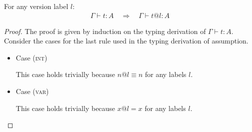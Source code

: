 \begin{lemma}
\label{lemma:overwriting}

For any version label $l$:
\begin{align*}
    \Gamma \vdash t : A
    \hspace{1em}\Longrightarrow\hspace{1em}
    \Gamma \vdash t@l : A
\end{align*}
\end{lemma}
\begin{proof}
The proof is given by induction on the typing derivation of $\Gamma \vdash t : A$.
Consider the cases for the last rule used in the typing derivation of assumption.
\\

\begin{itemize}
\item Case (\textsc{int})
\begin{center}
    \begin{minipage}{.25\linewidth}
    \end{minipage}
\end{center}
This case holds trivially because $n@l \equiv n$ for any labels $l$.
\\

\item Case (\textsc{var})
\begin{center}
    \begin{minipage}{.35\linewidth}
    \end{minipage}
\end{center}
This case holds trivially because $x@l = x$ for any labels $l$.
\\


\end{itemize}
\end{proof}
